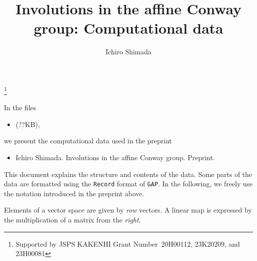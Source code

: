\documentclass{amsart} %
\begin{document}
\title[[Involutions in the affine Conway group: Computational data]
{Involutions in the affine Conway group: Computational data}


\author{Ichiro Shimada}
\address{Department of Mathematics,
Graduate School of Science,
Hiroshima University,
1-3-1 Kagamiyama,
Higashi-Hiroshima,
739-8526 JAPAN}
\thanks{Supported by JSPS KAKENHI Grant Number~20H00112, 23K20209, and 23H00081}

\maketitle
%
%
% 
In the  files
\begin{itemize}
\item  {} (??KB), 
\end{itemize}
 we present  the computational data used in the preprint 
\begin{itemize}
\item 
Ichiro Shimada.  Involutions in the affine {C}onway group. Preprint.
  \end{itemize}
This document explains the structure and contents of the data.
Some parts of the data are formatted using the {\tt Record} format of {\tt GAP}.
In the following, we freely use the notation introduced in the preprint above.
%
\par
Elements of a vector space are given by \emph{row} vectors.
A linear map is expressed by the multiplication of a matrix from the \emph{right}.
%
\end{document}
